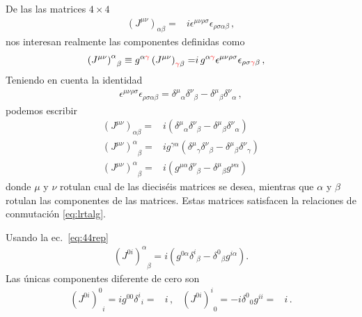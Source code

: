 \begin{frame}
De las las  matrices $4\times 4$ 
\begin{align}
   \left(J^{\mu\nu}\right)_{\alpha\beta}=&i\epsilon^{\mu\nu\rho\sigma}\epsilon_{\rho\sigma\alpha\beta}\,,
\end{align}
nos interesan realmente las componentes definidas como
\begin{align}
    { \left(J^{\mu\nu}\right)^{\alpha}}_{\beta}\equiv g^{\alpha {\color{red}\gamma}}\left(J^{\mu\nu}\right)_{{\color{red}\gamma}\beta}= &i\,g^{\alpha {\color{red}\gamma}}\epsilon^{\mu\nu\rho\sigma}\epsilon_{\rho\sigma {\color{red}\gamma} \beta}\,,
\end{align}
Teniendo en cuenta la identidad
\begin{align}
  \epsilon^{\mu\nu\rho\sigma}\epsilon_{\rho\sigma\alpha\beta}=
  {\delta^\mu}_\alpha{\delta^\nu}_\beta-{\delta^\mu}_\beta{\delta^\nu}_\alpha\,,
\end{align}
podemos escribir
\begin{align}
  \label{eq:44rep}
  \left(J^{\mu\nu}\right)_{\alpha\beta}  =&i\left({\delta^\mu}_\alpha{\delta^\nu}_\beta-{\delta^\mu}_\beta{\delta^\nu}_\alpha\right)\nonumber\\
 {\left(J^{\mu\nu}\right)^{\alpha}}_{\beta}=&ig^{\gamma\alpha}\left({\delta^{\mu}}_{\gamma}{\delta^\nu}_\beta-{\delta^\mu}_\beta{\delta^{\nu}}_\gamma\right) \nonumber\\
{\left(J^{\mu\nu}\right)^{\alpha}}_{\beta}  =  &i\left(g^{\mu\alpha}{\delta^\nu}_\beta-{\delta^\mu}_\beta g^{\nu\alpha}\right)
\end{align}
donde $\mu$ y $\nu$ rotulan cual de las dieciséis matrices se desea, mientras que $\alpha$ y $\beta$ rotulan las componentes de las matrices. Estas matrices satisfacen la relaciones de conmutación \eqref{eq:lrtalg}.

Usando la ec.~\eqref{eq:44rep}
\begin{align}
  {\left( J^{0i} \right)^{\alpha}}_{\beta}=
  i\left(g^{0\alpha}{\delta^i}_\beta-{\delta^0}_\beta g^{i\alpha}\right).
\end{align}
Las únicas componentes diferente de cero son
\begin{align}
  {\left( J^{0i} \right)^{0}}_{i}=ig^{00}{\delta^i}_i=&i\,,&
  {\left( J^{0i} \right)^{i}}_{0}=-i {\delta^0}_0 g^{ii}=&i\,.
\end{align}


\end{frame}
